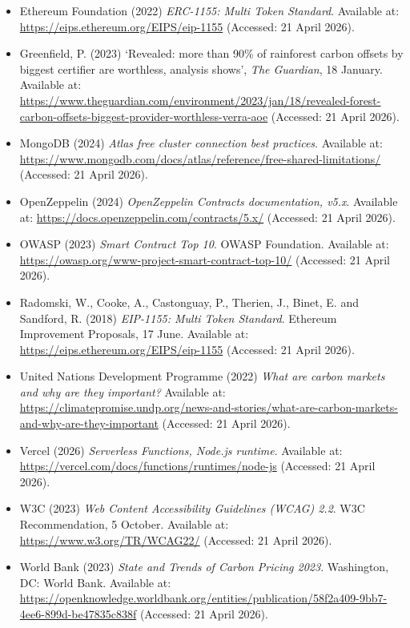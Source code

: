 \documentclass[11pt,a4paper]{article}
\begin{document}
\begin{itemize}[leftmargin=1.3em, itemsep=3pt, label={}]
    \item Ethereum Foundation (2022) \emph{ERC-1155: Multi Token Standard}. Available at: \url{https://eips.ethereum.org/EIPS/eip-1155} (Accessed: 21 April 2026).

    \item Greenfield, P. (2023) `Revealed: more than 90\% of rainforest carbon offsets by biggest certifier are worthless, analysis shows', \emph{The Guardian}, 18 January. Available at: \url{https://www.theguardian.com/environment/2023/jan/18/revealed-forest-carbon-offsets-biggest-provider-worthless-verra-aoe} (Accessed: 21 April 2026).

    \item MongoDB (2024) \emph{Atlas free cluster connection best practices}. Available at: \url{https://www.mongodb.com/docs/atlas/reference/free-shared-limitations/} (Accessed: 21 April 2026).

    \item OpenZeppelin (2024) \emph{OpenZeppelin Contracts documentation, v5.x}. Available at: \url{https://docs.openzeppelin.com/contracts/5.x/} (Accessed: 21 April 2026).

    \item OWASP (2023) \emph{Smart Contract Top 10}. OWASP Foundation. Available at: \url{https://owasp.org/www-project-smart-contract-top-10/} (Accessed: 21 April 2026).

    \item Radomski, W., Cooke, A., Castonguay, P., Therien, J., Binet, E. and Sandford, R. (2018) \emph{EIP-1155: Multi Token Standard}. Ethereum Improvement Proposals, 17 June. Available at: \url{https://eips.ethereum.org/EIPS/eip-1155} (Accessed: 21 April 2026).

    \item United Nations Development Programme (2022) \emph{What are carbon markets and why are they important?} Available at: \url{https://climatepromise.undp.org/news-and-stories/what-are-carbon-markets-and-why-are-they-important} (Accessed: 21 April 2026).

    \item Vercel (2026) \emph{Serverless Functions, Node.js runtime}. Available at: \url{https://vercel.com/docs/functions/runtimes/node-js} (Accessed: 21 April 2026).

    \item W3C (2023) \emph{Web Content Accessibility Guidelines (WCAG) 2.2}. W3C Recommendation, 5 October. Available at: \url{https://www.w3.org/TR/WCAG22/} (Accessed: 21 April 2026).

    \item World Bank (2023) \emph{State and Trends of Carbon Pricing 2023}. Washington, DC: World Bank. Available at: \url{https://openknowledge.worldbank.org/entities/publication/58f2a409-9bb7-4ee6-899d-be47835c838f} (Accessed: 21 April 2026).
\end{itemize}
\end{document}
